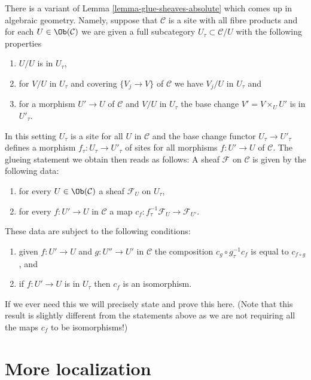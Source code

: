 \begin{remark}
\label{remark-variant-glue-sheaves-absolute}
There is a variant of Lemma \ref{lemma-glue-sheaves-absolute}
which comes up in algebraic geometry. Namely, suppose that $\mathcal{C}$
is a site with all fibre products and for each $U \in \Ob(\mathcal{C})$
we are given a full subcategory $U_\tau \subset \mathcal{C}/U$ with
the following properties
\begin{enumerate}
\item $U/U$ is in $U_\tau$,
\item for $V/U$ in $U_\tau$ and covering $\{V_j \to V\}$
of $\mathcal{C}$ we have $V_j/U$ in $U_\tau$ and
\item for a morphism $U' \to U$ of $\mathcal{C}$ and $V/U$ in $U_\tau$
the base change $V' = V \times_U U'$ is in $U'_\tau$.
\end{enumerate}
In this setting $U_\tau$ is a site for all $U$ in $\mathcal{C}$
and the base change functor $U_\tau \to U'_\tau$ defines a morphism
$f_\tau : U_\tau \to U'_\tau$ of sites for all morphisms $f : U' \to U$
of $\mathcal{C}$. The glueing statement we obtain then reads as follows:
A sheaf $\mathcal{F}$ on $\mathcal{C}$ is given by the following data:
\begin{enumerate}
\item for every $U \in \Ob(\mathcal{C})$ a sheaf
$\mathcal{F}_U$ on $U_\tau$,
\item for every $f : U' \to U$ in $\mathcal{C}$ a map
$c_f : f_\tau^{-1}\mathcal{F}_U \to \mathcal{F}_{U'}$.
\end{enumerate}
These data are subject to the following conditions:
\begin{enumerate}
\item[(a)] given $f : U' \to U$ and $g : U'' \to U'$ in
$\mathcal{C}$ the composition
$c_g \circ g_\tau^{-1}c_f$ is equal to $c_{f \circ g}$, and
\item[(b)] if $f : U' \to U$ is in $U_\tau$ then $c_f$ is an isomorphism.
\end{enumerate}
If we ever need this we will precisely state and prove this here.
(Note that this result is slightly different from the statements
above as we are not requiring all the maps $c_f$ to be isomorphisms!)
\end{remark}



\section{More localization}
\label{section-more-localize}

